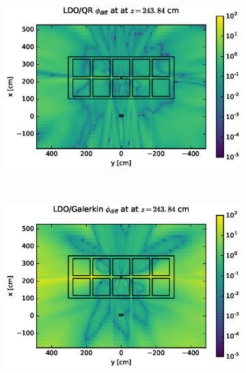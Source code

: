 \clearpage
\begin{figure}[!htb]
\begin{subfigure}{\textwidth}
\centering
\includegraphics[max height=0.445\textheight]
{img/cargo-plots/fwd/flux-diff-rel-qr04.eps}
\end{subfigure}
\\
\begin{subfigure}{\textwidth}
\centering
\includegraphics[max height=0.445\textheight]
{img/cargo-plots/fwd/flux-diff-rel-gkn04.eps}
\end{subfigure}
\end{figure}
\clearpage
